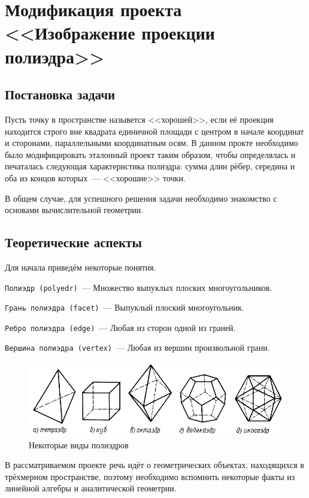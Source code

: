 \section{Модификация проекта <<Изображение проекции полиэдра>>}
\subsection*{Постановка задачи}

Пусть точку в пространстве назывется <<хорошей>>, если её проекция находится строго вне квадрата единичной площади с центром в начале координат и сторонами, параллельными координатным осям.   
В данном прокте необходимо было модифицировать эталонный проект таким образом, чтобы определялась и печаталась следующая характеристика полиэдра: сумма длин рёбер, середина и оба из концов которых~--- <<хорошие>> точки.

В общем случае, для успешного решения задачи необходимо знакомство с основами вычислительной геометрии.

\subsection*{Теоретические аспекты}

Для начала приведём некоторые понятия.


\verb|Полиэдр (polyedr)|~--- Множество выпуклых плоских многоугольников. 

\verb|Грань полиэдра (facet)|~--- Выпуклый плоский многоугольник. 

\verb|Ребро полиэдра (edge)|~--- Любая из сторон одной из граней. 

\verb|Вершина полиэдра (vertex)|~--- Любая из вершин произвольной грани. 


\begin{figure}[ht!]
\begin{center}
\includegraphics[width=0.9\hsize]{images/poly2}
\end{center}
\caption{Некоторые виды полиэдров}\label{fig:poly2}
\end{figure}


В рассматриваемом проекте речь идёт о геометрических объектах, находящихся в трёхмерном пространстве, поэтому необходимо вспомнить некоторые факты из линейной алгебры и аналитической геометрии.

